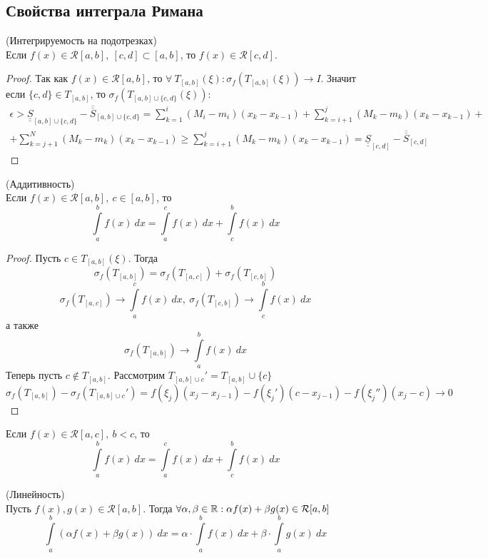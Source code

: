 \subsection{Свойства интеграла Римана}
\begin{numtheorem} (Интегрируемость на подотрезках)\\
    Если $f(x)\in \mathcal{R}[a,b],\ [c,d]\subset [a,b]$, то $f(x)\in \mathcal{R}[c,d]$.
\end{numtheorem}
\begin{proof}
    Так как $f(x)\in \mathcal{R}[a,b]$, то $\forall\ T_{[a,b]}(\xi): \sigma_f(T_{[a,b]}(\xi))\to I$. Значит если $\{c,d\}\in T_{[a,b]}$, то $\sigma_f(T_{[a,b]\cup \{c,d\}}(\xi)):$
    \begin{multline*}
        \epsilon> \underline{\underline{S}}_{[a,b]\cup \{c,d\}}-\overline{\overline{S}}_{{[a,b]\cup \{c,d\}}}=\sum\limits_{k=1}^{i}(M_i-m_i)(x_k-x_{k-1})+\sum\limits_{k=i+1}^{j}(M_k-m_k)(x_k-x_{k-1})+\\
        +\sum\limits_{k=j+1}^{N}(M_k-m_k)(x_k-x_{k-1})\geq \sum\limits_{k=i+1}^{j}(M_k-m_k)(x_k-x_{k-1})=\underline{\underline{S}}_{[c,d]}-\overline{\overline{S}}_{[c,d]}
    \end{multline*}
\end{proof}
\begin{numtheorem} (Аддитивность)\\
    Если $f(x)\in \mathcal{R}[a,b],\ c\in [a,b]$, то 
    \[\int\limits_{a}^{b}f(x)\ dx=\int\limits_{a}^{c} f(x)\ dx+\int\limits_{c}^{b}f(x)\ dx\]
\end{numtheorem}
\begin{proof}
    Пусть $c\in T_{[a,b]}(\xi)$. Тогда
    \[\sigma_f(T_{[a,b]})=\sigma_f(T_{[a,c]})+\sigma_f(T_{[c,b]})\]
    \[\sigma_f(T_{[a,c]}) \to \int\limits_{a}^{c}f(x)\ dx,\ \sigma_f(T_{[c,b]})\to \int\limits_{c}^{b}f(x)\ dx\]
    а также
    \[\sigma_f(T_{[a,b]})\to \int\limits_{a}^{b}f(x)\ dx\]
    Теперь пусть $c\not\in T_{[a,b]}$. Рассмотрим $T_{[a,b]\cup c}'=T_{[a,b]}\cup \{c\}$
        \[\sigma_f(T_{[a,b]})-\sigma_f(T_{[a,b]\cup c}')=f(\xi_j)(x_j-x_{j-1})-f(\xi_j')(c-x_{j-1})-f(\xi_j'')(x_j-c)\to 0\]
\end{proof} 
\begin{comm}
    Если $f(x)\in \mathcal{R}[a,c],\ b<c$, то
    \[\int\limits_{a}^{b}f(x)\ dx=\int\limits_{a}^{c}f(x)\ dx+\int\limits_{c}^{b}f(x)\ dx\]
\end{comm} 
\begin{numtheorem} (Линейность)\\
    Пусть $f(x),g(x)\in \mathcal{R}[a,b]$. Тогда $\forall \alpha,\beta \in \mathbb{R}: \alpha f(x)+\beta g(x) \in \mathcal{R}[a,b]$
    \[\int\limits_{a}^{b}(\alpha f(x)+\beta g(x))\ dx=\alpha\cdot \int\limits_{a}^{b} f(x)\ dx+\beta\cdot \int\limits_{a}^{b}g(x)\ dx\]
\end{numtheorem}
